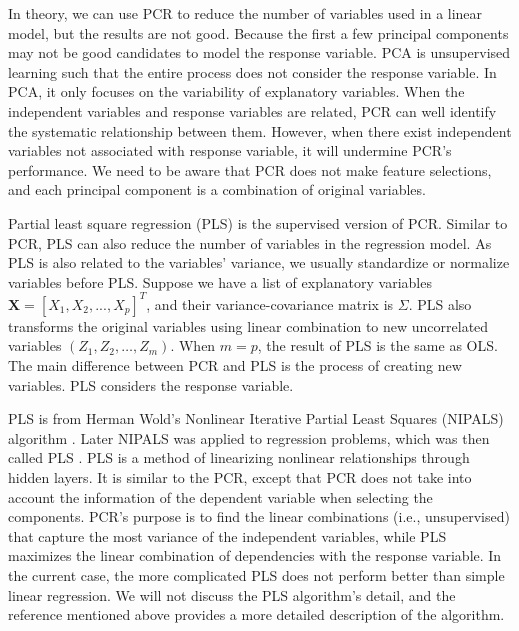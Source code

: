 \documentclass[
  12pt,
]{krantz}
\begin{document}
In theory, we can use PCR to reduce the number of variables used in a linear model, but the results are not good. Because the first a few principal components may not be good candidates to model the response variable. PCA is unsupervised learning such that the entire process does not consider the response variable. In PCA, it only focuses on the variability of explanatory variables. When the independent variables and response variables are related, PCR can well identify the systematic relationship between them. However, when there exist independent variables not associated with response variable, it will undermine PCR's performance. We need to be aware that PCR does not make feature selections, and each principal component is a combination of original variables.

Partial least square regression (PLS)  is the supervised version of PCR. Similar to PCR, PLS can also reduce the number of variables in the regression model. As PLS is also related to the variables' variance, we usually standardize or normalize variables before PLS. Suppose we have a list of explanatory variables \(\mathbf{X}=[X_{1},X_{2},...,X_{p}]^{T}\), and their variance-covariance matrix is \(\Sigma\). PLS also transforms the original variables using linear combination to new uncorrelated variables \((Z_{1} , Z_{2} , \ldots , Z_{m})\). When \(m=p\), the result of PLS is the same as OLS. The main difference between PCR and PLS is the process of creating new variables. PLS considers the response variable.

PLS is from Herman Wold's Nonlinear Iterative Partial Least Squares (NIPALS) algorithm \citep{wold1973, wold1982} . Later NIPALS was applied to regression problems, which was then called PLS . PLS is a method of linearizing nonlinear relationships through hidden layers. It is similar to the PCR, except that PCR does not take into account the information of the dependent variable when selecting the components. PCR's purpose is to find the linear combinations (i.e., unsupervised) that capture the most variance of the independent variables, while PLS maximizes the linear combination of dependencies with the response variable. In the current case, the more complicated PLS does not perform better than simple linear regression. We will not discuss the PLS algorithm's detail, and the reference mentioned above provides a more detailed description of the algorithm.
\end{document}
